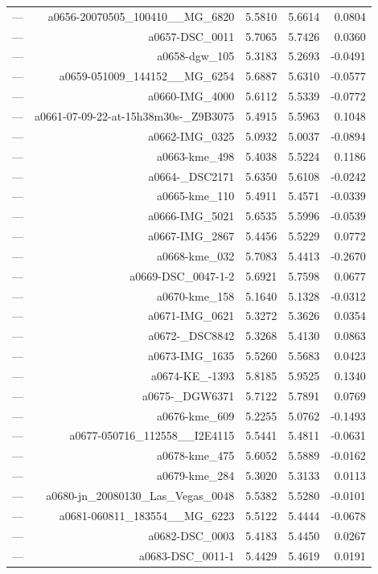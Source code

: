 \begin{table}[htbp]
\begin{tabular}{lrrrr}
— & a0656-20070505_100410__MG_6820 & 5.5810 & 5.6614 & 0.0804 \\
— & a0657-DSC_0011 & 5.7065 & 5.7426 & 0.0360 \\
— & a0658-dgw_105 & 5.3183 & 5.2693 & -0.0491 \\
— & a0659-051009_144152__MG_6254 & 5.6887 & 5.6310 & -0.0577 \\
— & a0660-IMG_4000 & 5.6112 & 5.5339 & -0.0772 \\
— & a0661-07-09-22-at-15h38m30s-_Z9B3075 & 5.4915 & 5.5963 & 0.1048 \\
— & a0662-IMG_0325 & 5.0932 & 5.0037 & -0.0894 \\
— & a0663-kme_498 & 5.4038 & 5.5224 & 0.1186 \\
— & a0664-_DSC2171 & 5.6350 & 5.6108 & -0.0242 \\
— & a0665-kme_110 & 5.4911 & 5.4571 & -0.0339 \\
— & a0666-IMG_5021 & 5.6535 & 5.5996 & -0.0539 \\
— & a0667-IMG_2867 & 5.4456 & 5.5229 & 0.0772 \\
— & a0668-kme_032 & 5.7083 & 5.4413 & -0.2670 \\
— & a0669-DSC_0047-1-2 & 5.6921 & 5.7598 & 0.0677 \\
— & a0670-kme_158 & 5.1640 & 5.1328 & -0.0312 \\
— & a0671-IMG_0621 & 5.3272 & 5.3626 & 0.0354 \\
— & a0672-_DSC8842 & 5.3268 & 5.4130 & 0.0863 \\
— & a0673-IMG_1635 & 5.5260 & 5.5683 & 0.0423 \\
— & a0674-KE_-1393 & 5.8185 & 5.9525 & 0.1340 \\
— & a0675-_DGW6371 & 5.7122 & 5.7891 & 0.0769 \\
— & a0676-kme_609 & 5.2255 & 5.0762 & -0.1493 \\
— & a0677-050716_112558__I2E4115 & 5.5441 & 5.4811 & -0.0631 \\
— & a0678-kme_475 & 5.6052 & 5.5889 & -0.0162 \\
— & a0679-kme_284 & 5.3020 & 5.3133 & 0.0113 \\
— & a0680-jn_20080130_Las_Vegas_0048 & 5.5382 & 5.5280 & -0.0101 \\
— & a0681-060811_183554__MG_6223 & 5.5122 & 5.4444 & -0.0678 \\
— & a0682-DSC_0003 & 5.4183 & 5.4450 & 0.0267 \\
— & a0683-DSC_0011-1 & 5.4429 & 5.4619 & 0.0191 \\

\end{tabular}
\end{table}
